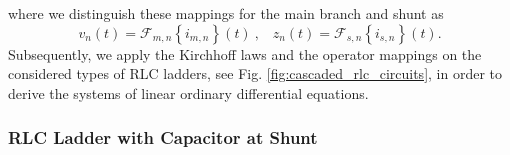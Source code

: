 \documentclass[a4paper, 10pt, twoside, twocolumn]{scrartcl}
\begin{document}
where we distinguish these mappings for the main branch and shunt as
\begin{equation}
	v_{n}(t) = \mathcal{F}_{m,n} \left\{i_{m,n}\right\}(t) ~ \text{,} \quad 
	z_{n}(t) = \mathcal{F}_{s,n} \left\{i_{s,n}\right\}(t) \text{.} \label{eq:operator_maps}
\end{equation}
Subsequently, we apply the Kirchhoff laws and the operator mappings on the considered types of RLC ladders, see Fig. \ref{fig:cascaded_rlc_circuits}, in order to derive the systems of linear ordinary differential equations.



%
%



\subsubsection*{RLC Ladder with Capacitor at Shunt}
\end{document}
